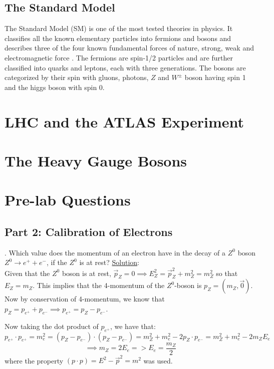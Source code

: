 \documentclass[a4paper]{report}
\numberwithin{equation}{section}
\begin{document}
\section{The Standard Model}
The Standard Model (SM) is one of the most tested theories in physics. It classifies all the known elementary particles into fermions and bosons and describes three of the four known fundamental forces of nature, strong, weak and electromagnetic force \cite{ParticleDataGroup:2020ssz}. The fermions are spin-1/2 particles and are further classified into quarks and leptons, each with three generations. The bosons are categorized by their spin with gluons, photons, $Z$ and $W^{\pm}$ boson having spin 1 and the higgs boson with spin 0. 

\chapter{LHC and the ATLAS Experiment} \label{chap:lhc_and_atlas}

\chapter{The Heavy Gauge Bosons} \label{chap:gauge_bosons}

\chapter{Pre-lab Questions} \label{chap:prelab}

\section{Part 2: Calibration of Electrons}

. Which value does the momentum of an electron have in the decay of a $Z^0$ boson $Z^0 \rightarrow e^+ + e^-$, if the $Z^0$ is at rest? 
\bigbreak
\noindent \underline{Solution}: \\
\noindent Given that the $Z^0$ boson is at rest, $\vec{p}_Z = 0 \implies E_Z^2 = \vec{p}_Z^2 + m_Z^2 = m_Z^2$ so that $E_Z = m_Z$. This implies that the 4-momentum of the $Z^0$-boson is $p_Z = (m_Z, \vec{0})$. 
\noindent Now by conservation of 4-momentum, we know that $p_Z = p_{e^+} + p_{e^-} \implies p_{e^+} = p_Z - p_{e^-}$. 

\noindent Now taking the dot product of $p_{e^+}$, we have that:
$$
p_{e^+} \cdot p_{e^+} = m_e^2 = (p_Z - p_{e^-}) \cdot (p_Z - p_{e^-}) = m_Z^2 + m_e^2 - 2 p_Z \cdot p_{e^-} = m_Z^2 + m_e^2 - 2m_Z E_e
$$
$$
\implies m_Z = 2E_e => E_e = \frac{m_Z}{2}
$$
\noindent where the property $(p \cdot p) = E^2 - \vec{p}^2 = m^2$ was used. 
\end{document}
